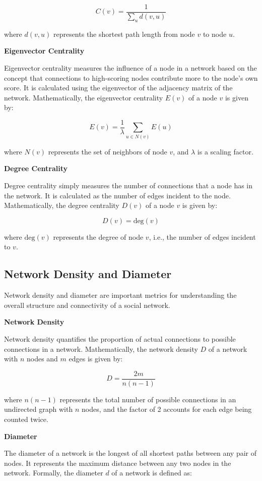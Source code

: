 \documentclass[12pt]{book} %
\begin{document}
\[ C(v) = \frac{1}{\sum_{u} d(v,u)} \]

where \(d(v,u)\) represents the shortest path length from node \(v\) to node \(u\).

\textbf{Eigenvector Centrality}

Eigenvector centrality measures the influence of a node in a network based on the concept that connections to high-scoring nodes contribute more to the node's own score. It is calculated using the eigenvector of the adjacency matrix of the network. Mathematically, the eigenvector centrality \(E(v)\) of a node \(v\) is given by:

\[ E(v) = \frac{1}{\lambda} \sum_{u \in N(v)} E(u) \]

where \(N(v)\) represents the set of neighbors of node \(v\), and \(\lambda\) is a scaling factor.

\textbf{Degree Centrality}

Degree centrality simply measures the number of connections that a node has in the network. It is calculated as the number of edges incident to the node. Mathematically, the degree centrality \(D(v)\) of a node \(v\) is given by:

\[ D(v) = \text{deg}(v) \]

where \(\text{deg}(v)\) represents the degree of node \(v\), i.e., the number of edges incident to \(v\).

\subsection{Network Density and Diameter}

Network density and diameter are important metrics for understanding the overall structure and connectivity of a social network.

\textbf{Network Density}

Network density quantifies the proportion of actual connections to possible connections in a network. Mathematically, the network density \(D\) of a network with \(n\) nodes and \(m\) edges is given by:

\[ D = \frac{2m}{n(n-1)} \]

where \(n(n-1)\) represents the total number of possible connections in an undirected graph with \(n\) nodes, and the factor of 2 accounts for each edge being counted twice.

\textbf{Diameter}

The diameter of a network is the longest of all shortest paths between any pair of nodes. It represents the maximum distance between any two nodes in the network. Formally, the diameter \(d\) of a network is defined as:
\end{document}
